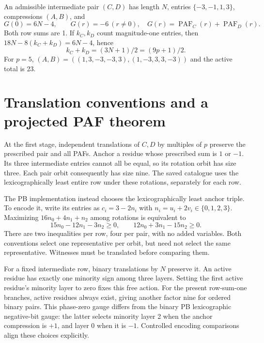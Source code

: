 \documentclass[11pt]{article}
\newcommand{\PAF}{\operatorname{PAF}}
\begin{document}
An admissible intermediate pair $(C,D)$ has length $N$, entries
$\{-3,-1,1,3\}$, compressions $(A,B)$, and
\begin{equation}\label{eq:intermediate}
 G(0)=6N-4,\qquad G(r)=-6\ (r\ne0),\quad
 G(r)=\PAF_C(r)+\PAF_D(r).
\end{equation}
Both row sums are 1. If $k_C,k_D$ count magnitude-one entries, then
$18N-8(k_C+k_D)=6N-4$, hence
\begin{equation}\label{eq:active}
 k_C+k_D=(3N+1)/2=(9p+1)/2.
\end{equation}
For $p=5$, $(A,B)=((1,3,-3,-3,3),(1,-3,3,3,-3))$ and the active total is 23.

\section{Translation conventions and a projected PAF theorem}
At the first stage, independent translations of $C,D$ by multiples of $p$
preserve the prescribed pair and all PAFs. Anchor a residue whose prescribed
sum is $1$ or $-1$. Its three intermediate entries cannot all be equal,
so its rotation orbit has size three. Each pair orbit consequently has size
nine. The saved catalogue uses the lexicographically least entire row under
these rotations, separately for each row.

The PB implementation instead chooses the lexicographically least anchor
triple. To encode it, write its entries as $c_i=3-2n_i$ with
$n_i=u_i+2v_i\in\{0,1,2,3\}$. Maximizing $16n_0+4n_1+n_2$ among rotations
is equivalent to
\begin{equation}\label{eq:gauge}
 15n_0-12n_1-3n_2\ge0,\qquad
 12n_0+3n_1-15n_2\ge0.
\end{equation}
There are two inequalities per row, four per pair, with no added variables.
Both conventions select one representative per orbit, but need not select
the same representative. Witnesses must be translated before comparing them.

For a fixed intermediate row, binary translations by $N$ preserve it.
An active residue has exactly one minority sign among three layers. Setting
the first active residue's minority layer to zero fixes this free action.
For the present row-sum-one branches, active residues always exist, giving
another factor nine for ordered binary pairs. This phase-zero gauge differs
from the binary PB lexicographic negative-bit gauge: the latter selects
minority layer 2 when the anchor compression is $+1$, and layer 0 when it
is $-1$. Controlled encoding comparisons align these choices explicitly.
\end{document}
